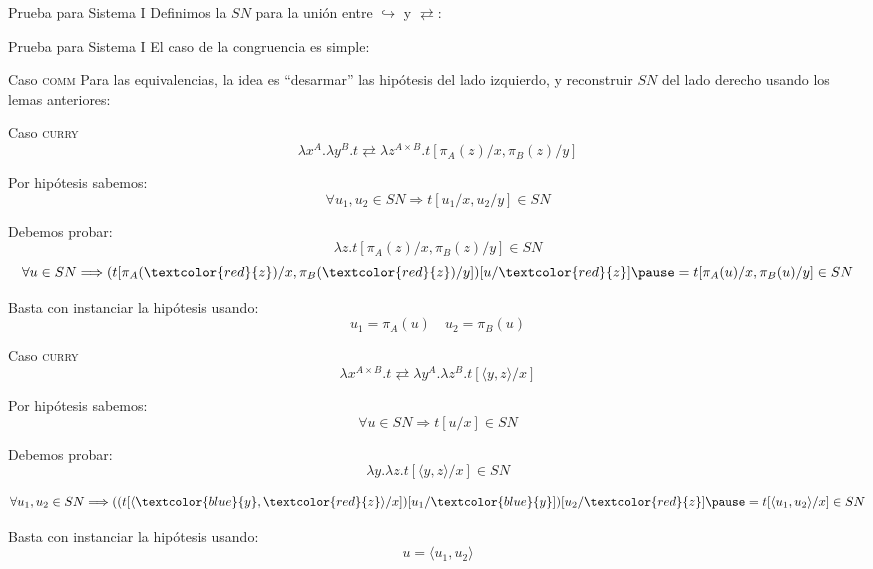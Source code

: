 \begin{frame}{Prueba para Sistema I}
	Definimos la $SN$ para la unión entre $\hookrightarrow$ y $\rightleftarrows$:
	\pause
\end{frame}

\begin{frame}{Prueba para Sistema I}
	El caso de la congruencia es simple:
\end{frame}

\begin{frame}{Caso \textsc{comm}}
	Para las equivalencias, la idea es ``desarmar'' las hipótesis del lado izquierdo, y reconstruir $SN$ del lado derecho usando los lemas anteriores:
\end{frame}

\begin{frame}{Caso \textsc{curry}}
	\[ \lambda x^A. \lambda y^B. t \rightleftarrows \lambda z^{A \times B}. t[\pi_A(z)/x, \pi_B(z)/y] \]
	\pause
	
	Por hipótesis sabemos:
	\[ \forall u_1, u_2 \in SN \Longrightarrow t[u_1/x, u_2/y] \in SN \]
	\pause
	
	Debemos probar:
	\[ \lambda z. t[\pi_A(z)/x, \pi_B(z)/y] \in SN \]
	\pause
	\[ \forall u \in SN \Longrightarrow (t[\pi_A(\textcolor{red}{z})/x, \pi_B(\textcolor{red}{z})/y])[u/\textcolor{red}{z}] \pause = t[\pi_A(u)/x, \pi_B(u)/y] \in SN \]
	 
	\pause
	Basta con instanciar la hipótesis usando:
	\[ u_1 = \pi_A(u) \quad u_2 = \pi_B(u) \]
\end{frame}

\begin{frame}{Caso \textsc{curry}}
	\[ \lambda x^{A \times B}. t \rightleftarrows \lambda y^A. \lambda z^B. t[\langle y, z \rangle/x] \]
	\pause
	
	Por hipótesis sabemos:
	\[ \forall u \in SN \Longrightarrow t[u/x] \in SN \]
	\pause
	
	Debemos probar:
	\[ \lambda y. \lambda z. t[\langle y, z \rangle/x] \in SN \]
	
	\pause
	\[ \forall u_1,u_2 \in SN \Longrightarrow ((t[\langle \textcolor{blue}{y}, \textcolor{red}{z} \rangle/x])[u_1/\textcolor{blue}{y}])[u_2/\textcolor{red}{z}] \pause = t[\langle u_1, u_2 \rangle/x] \in SN \]

	\pause
	Basta con instanciar la hipótesis usando:
	\[ u = \langle u_1, u_2 \rangle \]
\end{frame}
